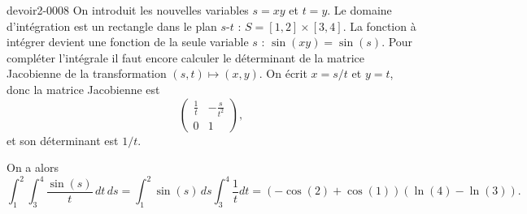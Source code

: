 \begin{corrige}{devoir2-0008}
On introduit les nouvelles variables $s=xy$ et $t=y$. Le domaine d'intégration est un rectangle dans le plan $s$-$t$ : $S= [1,2]\times [3,4]$. La fonction à intégrer devient une fonction de la seule variable $s$ : $\sin(xy)=\sin(s)$. Pour compléter l'intégrale il faut encore calculer le déterminant de la matrice Jacobienne de la transformation $(s,t)\mapsto(x,y)$. On écrit $x=s/t$ et $y=t$, donc la matrice Jacobienne est 
\begin{equation}
  \begin{pmatrix}
    \frac{1}{t} & -\frac{s}{t^2}\\
    0 & 1
  \end{pmatrix},
\end{equation}
  et son déterminant est $1/t$. 

On a alors 
\begin{equation}
  \int_1^2\int_3^ 4\frac{\sin(s)}{t}\, dt\, ds=  \int_1^2\sin(s)\,ds\int_3^ 4 \frac{1}{t}dt = \left(-\cos(2)+ \cos(1)\right)\left(\ln(4)-\ln(3)\right).
\end{equation}

\end{corrige}
